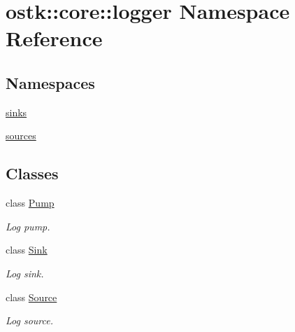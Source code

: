 \hypertarget{namespaceostk_1_1core_1_1logger}{}\section{ostk\+:\+:core\+:\+:logger Namespace Reference}
\label{namespaceostk_1_1core_1_1logger}
\subsection*{Namespaces}
\begin{DoxyCompactItemize}
\item 
 \hyperlink{namespaceostk_1_1core_1_1logger_1_1sinks}{sinks}
\item 
 \hyperlink{namespaceostk_1_1core_1_1logger_1_1sources}{sources}
\end{DoxyCompactItemize}
\subsection*{Classes}
\begin{DoxyCompactItemize}
\item 
class \hyperlink{classostk_1_1core_1_1logger_1_1_pump}{Pump}
\begin{DoxyCompactList}\small\item\em Log pump. \end{DoxyCompactList}\item 
class \hyperlink{classostk_1_1core_1_1logger_1_1_sink}{Sink}
\begin{DoxyCompactList}\small\item\em Log sink. \end{DoxyCompactList}\item 
class \hyperlink{classostk_1_1core_1_1logger_1_1_source}{Source}
\begin{DoxyCompactList}\small\item\em Log source. \end{DoxyCompactList}\end{DoxyCompactItemize}

